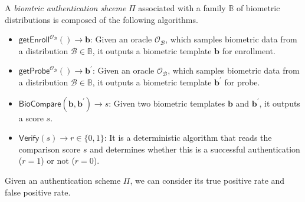 \begin{definition}

A \emph{biomtric authentication shceme} $\Pi$ associated with a family $\mathbb{B}$ of biometric distributions is composed of the following algorithms.

\begin{itemize}

	\item $\textsf{getEnroll}^{\mathcal{O}_{\mathcal{B}}}() \to \mathbf{b}$: Given an oracle $\mathcal{O}_{\mathcal{B}}$, which samples biometric data from a distribution $\mathcal{B} \in \mathbb{B}$, it outputs a biometric template $\mathbf{b}$ for enrollment.

	\item $\textsf{getProbe}^{\mathcal{O}_{\mathcal{B}}}() \to \mathbf{b}^\prime$: Given an oracle $\mathcal{O}_{\mathcal{B}}$, which samples biometric data from a distribution $\mathcal{B} \in \mathbb{B}$, it outputs a biometric template $\mathbf{b}^\prime$ for probe.

	\item $\textsf{BioCompare}(\mathbf{b}, \mathbf{b}^\prime) \to s$: Given two biometric templates $\mathbf{b}$ and $\mathbf{b}^\prime$, it outputs a score $s$. 

	\item $\textsf{Verify}(s) \to r \in \{0,1\}$: It is a deterministic algorithm that reads the comparison score $s$ and determines whether this is a successful authentication ($r = 1$) or not ($r = 0$).

\end{itemize}

\end{definition}

Given an authentication scheme $\Pi$, we can consider its true positive rate and false positive rate.

